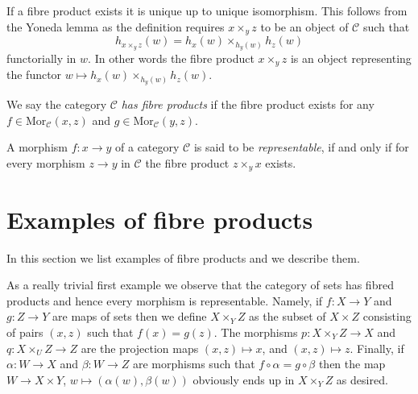 \noindent
If a fibre product exists it is unique up to unique
isomorphism. This follows from the Yoneda lemma as
the definition requires $x\times_yz$ to be an object
of $\mathcal{C}$ such that
$$
h_{x\times_y z}(w) = h_x(w) \times_{h_y(w)} h_z(w)
$$
functorially in $w$. In other words the fibre product $x\times_yz$
is an object representing the functor
$w \mapsto h_x(w) \times_{h_y(w)} h_z(w)$.

\begin{definition}
\label{definition-has-fibre-products}
We say the category $\mathcal{C}$ {\it has fibre products} if
the fibre product exists for any $f\in \text{Mor}_{\mathcal C}(x,z)$
and $g\in \text{Mor}_{\mathcal C}(y,z)$.
\end{definition}

\begin{definition}
\label{definition-representable-morphism}
A morphism $f : x \to y$ of a category $\mathcal{C}$ is said to be
{\it representable}, if and only if for every morphism $z \to y$
in $\mathcal{C}$ the fibre product $z\times_y x$ exists.
\end{definition}

\section{Examples of fibre products}
\label{section-example-fibre-products}

\noindent
In this section we list examples of fibre products and
we describe them.

\medskip\noindent 
As a really trivial first example we observe 
that the category of sets has fibred products and hence every
morphism is representable. Namely, if $f : X \to Y$
and $g : Z \to Y$ are maps of sets then we define
$X\times_Y Z$ as the subset of $X\times Z$ consisting
of pairs $(x,z)$ such that $f(x) = g(z)$. The morphisms
$p : X\times_Y Z \to X$ and $q : X\times_U Z \to Z$ are
the projection maps $(x,z) \mapsto x$, and $(x,z) \mapsto z$.
Finally, if $\alpha : W \to X$ and $\beta : W \to Z$ 
are morphisms such that $f \circ \alpha = g \circ \beta$
then the map $W \to X\times Y$, $w\mapsto (\alpha(w), \beta(w))$
obviously ends up in $X\times_YZ$ as desired.

